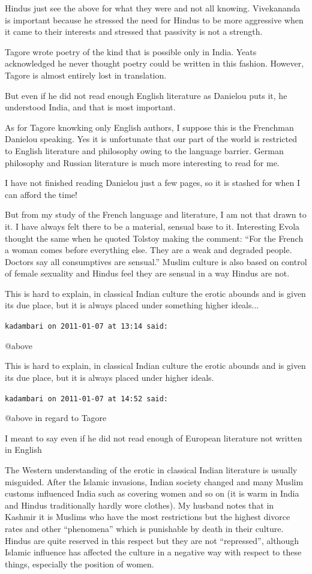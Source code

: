 \begin{footnotesize}
\begin{sffamily}
Hindus just see the above for what they were and not all knowing. Vivekananda is important because he stressed the need for Hindus to be more aggressive when it came to their interests and stressed that passivity is not a strength.

Tagore wrote poetry of the kind that is possible only in India. Yeats acknowledged he never thought poetry could be written in this fashion. However, Tagore is almost entirely lost in translation.

But even if he did not read enough English literature as Danielou puts it, he understood India, and that is most important.

As for Tagore knowking only English authors, I suppose this is the Frenchman Danielou speaking. Yes it is unfortunate that our part of the world is restricted to English literature and philosophy owing to the language barrier. German philosophy and Russian literature is much more interesting to read for me.

I have not finished reading Danielou just a few pages, so it is stashed for when I can afford the time!

But from my study of the French language and literature, I am not that drawn to it. I have always felt there to be a material, sensual base to it. Interesting Evola thought the same when he quoted Tolstoy making the comment: ``For the French a woman comes before everything else. They are a weak and degraded people. Doctors say all consumptives are sensual.'' Muslim culture is also based on control of female sexuality and Hindus feel they are sensual in a way Hindus are not.

This is hard to explain, in classical Indian culture the erotic abounds and is given its due place, but it is always placed under something higher ideals... 

\hfill

\texttt{kadambari on 2011-01-07 at 13:14 said:}

@above

This is hard to explain, in classical Indian culture the erotic abounds and is given its due place, but it is always placed under higher ideals.

\hfill

\texttt{kadambari on 2011-01-07 at 14:52 said:}

@above in regard to Tagore

I meant to say even if he did not read enough of European literature not written in English

The Western understanding of the erotic in classical Indian literature is usually misguided. After the Islamic invasions, Indian society changed and many Muslim customs influenced India such as covering women and so on (it is warm in India and Hindus traditionally hardly wore clothes). My husband notes that in Kashmir it is Muslims who have the most restrictions but the highest divorce rates and other ``phenomena'' which is punishable by death in their culture. Hindus are quite reserved in this respect but they are not ``repressed'', although Islamic influence has affected the culture in a negative way with respect to these things, especially the position of women.


\end{sffamily}
\end{footnotesize}
